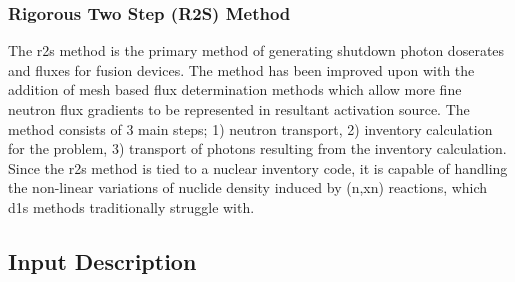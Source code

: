 \documentclass[12pt]{article}
\begin{document}
\subsubsection{Rigorous Two Step (R2S) Method}
The \gls{r2s} method \cite{r2s} is the primary method of generating shutdown
photon doserates and fluxes for fusion devices. The method has been improved
upon with the addition of mesh based flux determination methods
\cite{mcr2s,r2smesh,r2suned,pyne_r2s} which allow more fine neutron flux
gradients to be represented in resultant activation source. The method consists
of 3 main steps; 1) neutron transport, 2) inventory calculation for the problem,
3) transport of photons resulting from the inventory calculation. Since the
\gls{r2s} method is tied to a nuclear inventory code, it is capable of handling
the non-linear variations of nuclide density induced by (n,xn) reactions, which
\gls{d1s} methods traditionally struggle with.
\subsection{Input Description}
\end{document}
